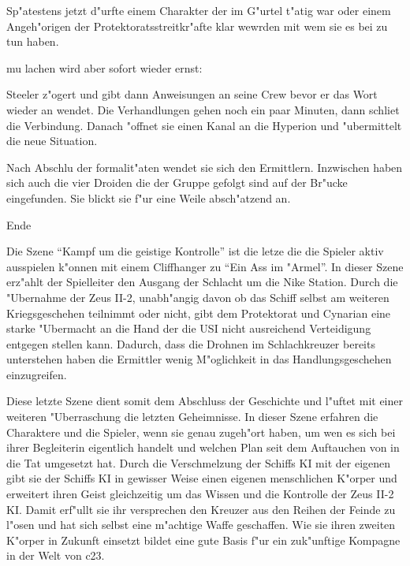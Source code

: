 
Sp"atestens jetzt d"urfte einem Charakter der im G"urtel t"atig war oder einem Angeh"origen der Protektoratsstreitkr"afte klar wewrden mit wem sie es bei \xl{} zu tun haben.

\xl{} mu\3 lachen wird aber sofort wieder ernst:


Steeler z"ogert und gibt dann Anweisungen an seine Crew bevor er das Wort wieder an \xl{} wendet. Die Verhandlungen gehen noch ein paar Minuten, dann schlie\3t \xl{} die Verbindung. Danach "offnet sie einen Kanal an die Hyperion und "ubermittelt die neue Situation.

Nach Abschlu\3 der formalit"aten wendet sie sich den Ermittlern. Inzwischen haben sich auch die vier Droiden die der Gruppe gefolgt sind auf der Br"ucke eingefunden. Sie blickt sie f"ur eine Weile absch"atzend an.

\vfill\pagebreak

\begin{remarks}
	\begin{center}\huge{}Ende\end{center}

	Die Szene "`Kampf um die geistige Kontrolle"' ist die letze die die Spieler aktiv ausspielen k"onnen mit einem Cliffhanger zu "`Ein Ass im "Armel"'. In dieser Szene erz"ahlt der Spielleiter den Ausgang der Schlacht um die Nike Station. Durch die "Ubernahme der Zeus II-2, unabh"angig davon ob das Schiff selbst am weiteren Kriegsgeschehen teilnimmt oder nicht, gibt dem Protektorat und Cynarian eine starke "Ubermacht an die Hand der die USI nicht ausreichend Verteidigung entgegen stellen kann. Dadurch, dass die Drohnen im Schlachkreuzer bereits \xl{} unterstehen haben die Ermittler wenig M"oglichkeit in das Handlungsgeschehen einzugreifen.

	Diese letzte Szene dient somit dem Abschluss der Geschichte und l"uftet mit einer weiteren "Uberraschung die letzten Geheimnisse. In dieser Szene erfahren die Charaktere und die Spieler, wenn sie genau zugeh"ort haben, um wen es sich bei ihrer Begleiterin eigentlich handelt und welchen Plan \xl{} seit dem Auftauchen von \ml{} in die Tat umgesetzt hat. Durch die Verschmelzung der Schiffs KI mit der eigenen gibt sie der Schiffs KI in gewisser Weise einen eigenen menschlichen K"orper und erweitert ihren Geist gleichzeitig um das Wissen und die Kontrolle der Zeus II-2 KI. Damit erf"ullt sie ihr versprechen den Kreuzer aus den Reihen der Feinde zu l"osen und hat sich selbst eine m"achtige Waffe geschaffen. Wie sie ihren zweiten K"orper in Zukunft einsetzt bildet eine gute Basis f"ur ein zuk"unftige Kompagne in der Welt von c23.
\end{remarks}